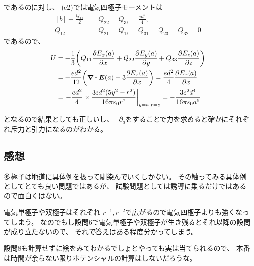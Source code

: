 \documentclass[../../sp_2022.tex]{subfiles}
\begin{document}
であるのに対し、
(c2)では電気四極子モーメントは
\begin{equation}\begin{aligned}[b]
    -\frac{Q_{11}}{2} &= Q_{22} = Q_{33} = \frac{ed^2}{4},\\
    Q_{12} &= Q_{21} = Q_{13} = Q_{31} = Q_{23} = Q_{32} = 0
\end{aligned}\end{equation}
であるので、
\begin{equation}\begin{aligned}[b]
    U &= -\frac{1}{3} \qty(Q_{11}\pdv{E_x(a)}{x}+Q_{22}\pdv{E_y(a)}{y}+Q_{33}\pdv{E_z(a)}{z})\\
    &= -\frac{ed^2}{12} \qty(\div \vb*{E}(a)-3\pdv{E_x(a)}{x})
    = \frac{ed^2}{4} \pdv{E_x(a)}{x}\\
    &= \left.-\frac{ed^2}{4} \times \frac{3ed^2(5y^2-r^2)}{16\pi\varepsilon_0r^7}\right|_{y=a,r=a}
    = -\frac{3e^2d^4}{16\pi\varepsilon_0a^5}
\end{aligned}\end{equation}

となるので結果としても正しいし、\(-\partial_a\)をすることで力を求めると確かにそれぞれ斥力と引力になるのがわかる。

\subsection*{感想}
多極子は地道に具体例を扱って馴染んでいくしかない。
その触ってみる具体例としてとても良い問題ではあるが、
試験問題としては誘導に乗るだけではあるので面白くはない。

電気単極子や双極子はそれぞれ \(r^{-1},r^{-2}\)で広がるので電気四極子よりも強くなってしまう。
なのでもし設問6で電気単極子や双極子が生き残るとそれ以降の設問が成り立たないので、
それで答えはある程度分かってしまう。

設問8も計算せずに絵をみてわかるでしょとやっても実は当てられるので、
本番は時間が余らない限りポテンシャルの計算はしないだろうな。
\end{document}
